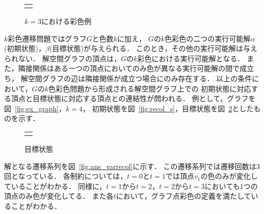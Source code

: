 \begin{figure}[htbp]
  \centering
  \begin{tabular}{c}
    
    \begin{minipage}{0.45\hsize}
      \centering
      
      \caption{グラフ}
      \label{fig:ex_graph}
    \end{minipage}

    \begin{minipage}{0.45\hsize}
      \centering
      
      \caption{$k=3$における彩色例}
      \label{fig:graph_col}
    \end{minipage}

  \end{tabular}  
\end{figure}

$k$彩色遷移問題ではグラフ$G$と色数$k$に加え，
$G$の$k$色彩色の二つの実行可能解$\alpha$(初期状態)，$\beta$(目標状態)が与えられる． 
このとき，その他の実行可能解は与えられない． 
解空間グラフの頂点は，$G$の$k$彩色における実行可能解となる．
また，隣接関係はある一つの頂点においてのみ色が異なる実行可能解の間で成立ち，
解空間グラフの辺は隣接関係が成立つ場合にのみ存在する．
以上の条件において，$G$の$k$色彩色問題から形成される解空間グラフ上での
初期状態に対応する頂点と目標状態に対応する頂点との連結性が問われる． 
例として，グラフを図~\ref{fig:ex_graph}，$k=4$，
初期状態を図~\ref{fig:recol_s}，目標状態を図~\ref{fig:recol_g}としたものを示す．

\begin{figure}[htbp]
  \centering
  \begin{tabular}{c}

    \begin{minipage}{0.45\hsize}
      \centering
      
      \caption{初期状態}
      \label{fig:recol_s}
    \end{minipage}

    \begin{minipage}{0.45\hsize}
      \centering
      
      \caption{目標状態}
      \label{fig:recol_g}
    \end{minipage}
    
  \end{tabular}
\end{figure}

解となる遷移系列を図~\ref{fig:ans_varrecol}に示す．
この遷移系列では遷移回数は3回となっている．
各制約については，$t=0$と$t=1$では頂点$v_1$の色のみが変化していることがわかる． 
同様に，$t=1$から$t=2$，$t=2$から$t=3$においても1つの頂点のみ色が変化してる． 
また各$t$において，グラフ点彩色の定義を満たしていることがわかる．

